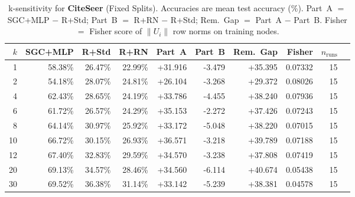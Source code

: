 \begin{table}[t]
\centering\small\setlength{\tabcolsep}{5pt}
\caption{k-sensitivity for \textbf{CiteSeer} (Fixed Splits). Accuracies are mean test accuracy (\%). Part~A $=$ SGC+MLP $-$ R+Std; Part~B $=$ R+RN $-$ R+Std; Rem.~Gap $=$ Part~A $-$ Part~B. Fisher $=$ Fisher score of $\|U_i\|$ row norms on training nodes.}
\label{tab:exp8_per_dataset_citeseer_fixed}
\begin{tabular}{rrrrrrrrrr}
\toprule
$k$ & SGC+MLP & R+Std & R+RN & Part~A & Part~B & Rem.~Gap & Fisher & $n_{\mathrm{runs}}$ \\
\midrule
1 & 58.38\% & 26.47\% & 22.99\% & +31.916 & -3.479 & +35.395 & 0.07332 & 15 \\
2 & 54.18\% & 28.07\% & 24.81\% & +26.104 & -3.268 & +29.372 & 0.08026 & 15 \\
4 & 62.43\% & 28.65\% & 24.19\% & +33.786 & -4.455 & +38.240 & 0.07936 & 15 \\
6 & 61.72\% & 26.57\% & 24.29\% & +35.153 & -2.272 & +37.426 & 0.07243 & 15 \\
8 & 64.14\% & 30.97\% & 25.92\% & +33.172 & -5.048 & +38.220 & 0.07015 & 15 \\
10 & 66.72\% & 30.15\% & 26.93\% & +36.571 & -3.218 & +39.789 & 0.07188 & 15 \\
12 & 67.40\% & 32.83\% & 29.59\% & +34.570 & -3.238 & +37.808 & 0.07419 & 15 \\
20 & 69.13\% & 34.57\% & 28.46\% & +34.560 & -6.114 & +40.674 & 0.05438 & 15 \\
30 & 69.52\% & 36.38\% & 31.14\% & +33.142 & -5.239 & +38.381 & 0.04578 & 15 \\
\bottomrule
\end{tabular}
\end{table}
